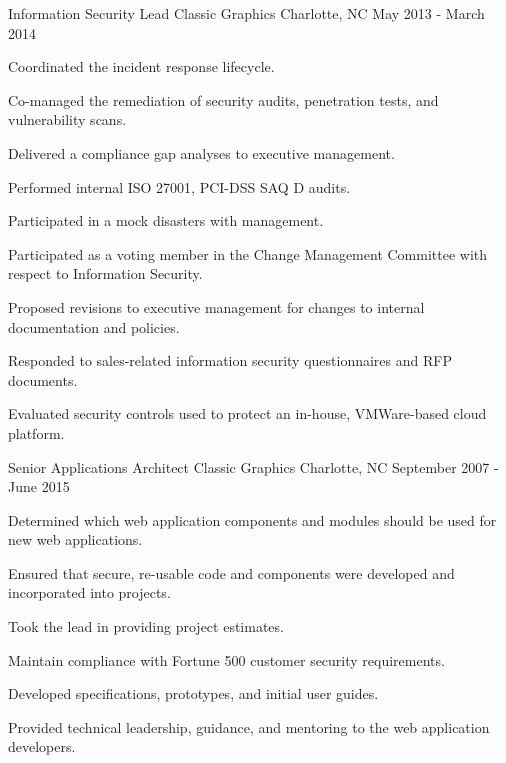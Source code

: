\begin{cventries}

\cventry
{Information Security Lead}
{Classic Graphics} %
{Charlotte, NC} %
{May 2013 - March 2014} %
{
\begin{cvitems}
\item[]
\item {Coordinated the incident response lifecycle.}
\item {Co-managed the remediation of security audits, penetration tests, and vulnerability scans.}
\item {Delivered a compliance gap analyses to executive management.}
\item {Performed internal ISO 27001, PCI-DSS SAQ D audits.}
\item {Participated in a mock disasters with management.}
\item {Participated as a voting member in the Change Management Committee with respect to Information Security.}
\item {Proposed revisions to executive management for changes to internal documentation and policies.}
\item {Responded to sales-related information security questionnaires and RFP documents.}
\item {Evaluated security controls used to protect an in-house, VMWare-based cloud platform.}
\end{cvitems}
}


\cventry
{Senior Applications Architect}
{Classic Graphics} %
{Charlotte, NC} %
{September 2007 - June 2015} %
{
\begin{cvitems}
\item[]
\item {Determined which web application components and modules should be used for new web applications.}
\item {Ensured that secure, re-usable code and components were developed and incorporated into projects.}
\item {Took the lead in providing project estimates.}
\item {Maintain compliance with Fortune 500 customer security requirements.}
\item {Developed specifications, prototypes, and initial user guides.}
\item {Provided technical leadership, guidance, and mentoring to the web application developers.}
\end{cvitems}
}


\end{cventries}
